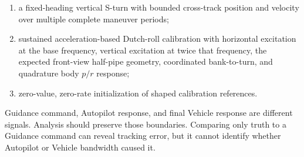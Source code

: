 \begin{enumerate}
          bank-to-turn realizations, including the optional zero body-$y$
          coordinated-force constraint;
    \item a fixed-heading vertical S-turn with bounded cross-track position and
          velocity over multiple complete maneuver periods;
    \item sustained acceleration-based Dutch-roll calibration with horizontal
          excitation at the base frequency, vertical excitation at twice that
          frequency, the expected front-view half-pipe geometry, coordinated
          bank-to-turn, and quadrature body \(p/r\) response;
    \item zero-value, zero-rate initialization of shaped calibration references.
\end{enumerate}

\begin{warningbox}
Guidance command, Autopilot response, and final Vehicle response are different
signals. Analysis should preserve those boundaries. Comparing only truth to a
Guidance command can reveal tracking error, but it cannot identify whether
Autopilot or Vehicle bandwidth caused it.
\end{warningbox}
